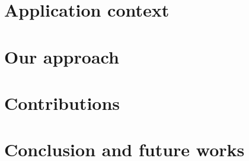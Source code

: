    \section[Context]{Application context}
    
    
    
    
    \section{Our approach}
    
    
    \section[KG-based system]{Contributions}
    
    
    
    
    
    
    \section[Conclusion]{Conclusion and future works}
    
    
    
    
    \miniframesoff
    

